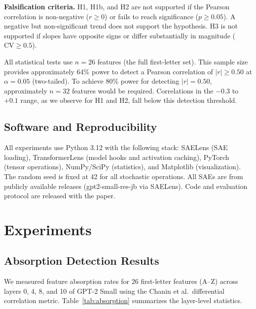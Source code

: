\documentclass{article}
\begin{document}
\textbf{Falsification criteria.} H1, H1b, and H2 are not supported if the Pearson correlation is non-negative ($r \geq 0$) or fails to reach significance ($p \geq 0.05$). A negative but non-significant trend does not support the hypothesis. H3 is not supported if slopes have opposite signs or differ substantially in magnitude ($\text{CV} \geq 0.5$).

All statistical tests use $n = 26$ features (the full first-letter set). This sample size provides approximately 64\% power to detect a Pearson correlation of $|r| \geq 0.50$ at $\alpha = 0.05$ (two-tailed). To achieve 80\% power for detecting $|r| = 0.50$, approximately $n = 32$ features would be required. Correlations in the $-0.3$ to $+0.1$ range, as we observe for H1 and H2, fall below this detection threshold.

\subsection{Software and Reproducibility}

All experiments use Python 3.12 with the following stack: SAELens (SAE loading), TransformerLens (model hooks and activation caching), PyTorch (tensor operations), NumPy/SciPy (statistics), and Matplotlib (visualization). The random seed is fixed at 42 for all stochastic operations. All SAEs are from publicly available releases (gpt2-small-res-jb via SAELens). Code and evaluation protocol are released with the paper.

\section{Experiments}
\label{sec:results}

\subsection{Absorption Detection Results}
\label{sec:absorption_results}

We measured feature absorption rates for 26 first-letter features (A--Z) across layers 0, 4, 8, and 10 of GPT-2 Small using the Chanin et al.~differential correlation metric. Table~\ref{tab:absorption} summarizes the layer-level statistics.
\end{document}
